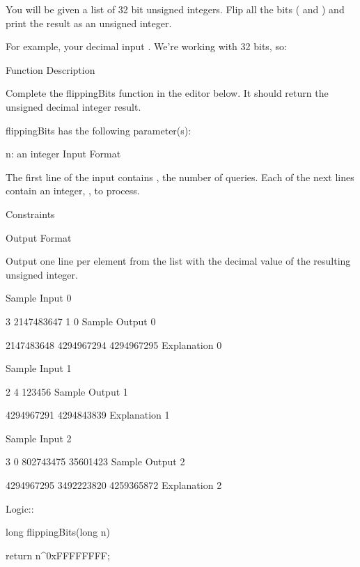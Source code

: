 You will be given a list of 32 bit unsigned integers. Flip all the bits ( and ) and print the result as an unsigned integer.

For example, your decimal input . We're working with 32 bits, so:



Function Description

Complete the flippingBits function in the editor below. It should return the unsigned decimal integer result.

flippingBits has the following parameter(s):

n: an integer
Input Format

The first line of the input contains , the number of queries.
Each of the next  lines contain an integer, , to process.

Constraints



Output Format

Output one line per element from the list with the decimal value of the resulting unsigned integer.

Sample Input 0

3
2147483647
1
0
Sample Output 0

2147483648
4294967294
4294967295
Explanation 0







Sample Input 1

2
4
123456
Sample Output 1

4294967291
4294843839
Explanation 1





Sample Input 2

3
0
802743475
35601423
Sample Output 2

4294967295
3492223820
4259365872
Explanation 2




Logic::

long flippingBits(long n) {
    return n^0xFFFFFFFF;

}


